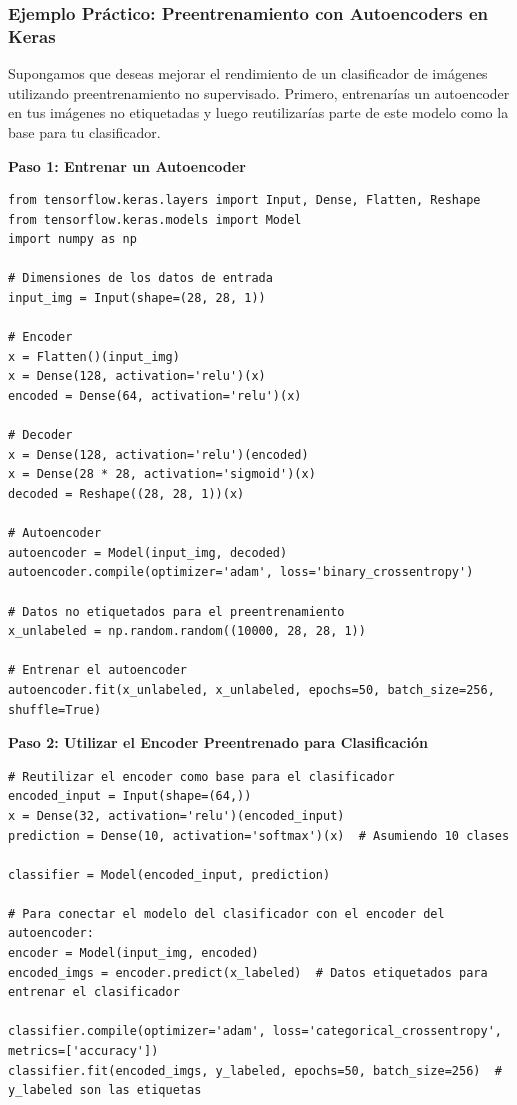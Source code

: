 \documentclass[11pt]{article}
\begin{document}
\subsubsection{Ejemplo Práctico: Preentrenamiento con Autoencoders en Keras}
\label{sec:orga98018b}
Supongamos que deseas mejorar el rendimiento de un clasificador de
imágenes utilizando preentrenamiento no supervisado. Primero,
entrenarías un autoencoder en tus imágenes no etiquetadas y luego
reutilizarías parte de este modelo como la base para tu clasificador.

\textbf{Paso 1: Entrenar un Autoencoder}

\begin{verbatim}
from tensorflow.keras.layers import Input, Dense, Flatten, Reshape
from tensorflow.keras.models import Model
import numpy as np

# Dimensiones de los datos de entrada
input_img = Input(shape=(28, 28, 1))

# Encoder
x = Flatten()(input_img)
x = Dense(128, activation='relu')(x)
encoded = Dense(64, activation='relu')(x)

# Decoder
x = Dense(128, activation='relu')(encoded)
x = Dense(28 * 28, activation='sigmoid')(x)
decoded = Reshape((28, 28, 1))(x)

# Autoencoder
autoencoder = Model(input_img, decoded)
autoencoder.compile(optimizer='adam', loss='binary_crossentropy')

# Datos no etiquetados para el preentrenamiento
x_unlabeled = np.random.random((10000, 28, 28, 1))

# Entrenar el autoencoder
autoencoder.fit(x_unlabeled, x_unlabeled, epochs=50, batch_size=256, shuffle=True)
\end{verbatim}

\textbf{Paso 2: Utilizar el Encoder Preentrenado para Clasificación}

\begin{verbatim}
# Reutilizar el encoder como base para el clasificador
encoded_input = Input(shape=(64,))
x = Dense(32, activation='relu')(encoded_input)
prediction = Dense(10, activation='softmax')(x)  # Asumiendo 10 clases

classifier = Model(encoded_input, prediction)

# Para conectar el modelo del clasificador con el encoder del autoencoder:
encoder = Model(input_img, encoded)
encoded_imgs = encoder.predict(x_labeled)  # Datos etiquetados para entrenar el clasificador

classifier.compile(optimizer='adam', loss='categorical_crossentropy', metrics=['accuracy'])
classifier.fit(encoded_imgs, y_labeled, epochs=50, batch_size=256)  # y_labeled son las etiquetas
\end{verbatim}
\end{document}
